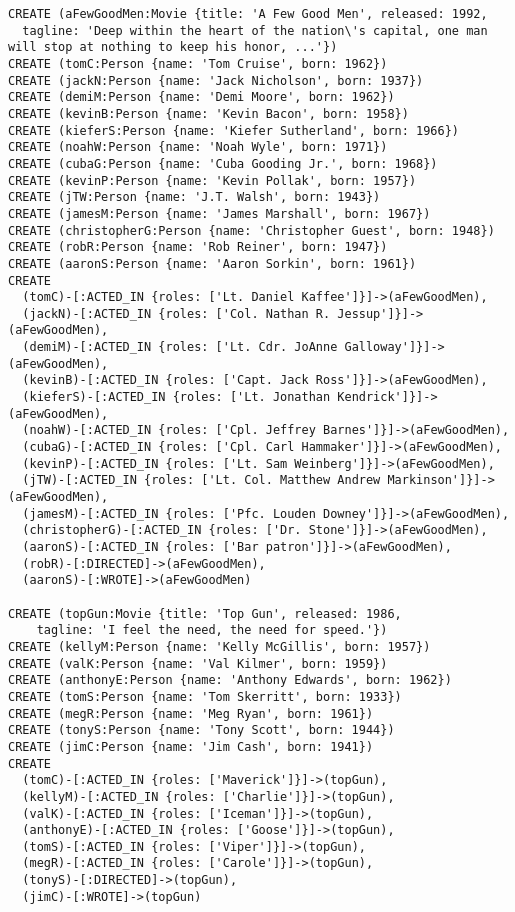 \begin{lstlisting}
CREATE (aFewGoodMen:Movie {title: 'A Few Good Men', released: 1992,
  tagline: 'Deep within the heart of the nation\'s capital, one man will stop at nothing to keep his honor, ...'})
CREATE (tomC:Person {name: 'Tom Cruise', born: 1962})
CREATE (jackN:Person {name: 'Jack Nicholson', born: 1937})
CREATE (demiM:Person {name: 'Demi Moore', born: 1962})
CREATE (kevinB:Person {name: 'Kevin Bacon', born: 1958})
CREATE (kieferS:Person {name: 'Kiefer Sutherland', born: 1966})
CREATE (noahW:Person {name: 'Noah Wyle', born: 1971})
CREATE (cubaG:Person {name: 'Cuba Gooding Jr.', born: 1968})
CREATE (kevinP:Person {name: 'Kevin Pollak', born: 1957})
CREATE (jTW:Person {name: 'J.T. Walsh', born: 1943})
CREATE (jamesM:Person {name: 'James Marshall', born: 1967})
CREATE (christopherG:Person {name: 'Christopher Guest', born: 1948})
CREATE (robR:Person {name: 'Rob Reiner', born: 1947})
CREATE (aaronS:Person {name: 'Aaron Sorkin', born: 1961})
CREATE
  (tomC)-[:ACTED_IN {roles: ['Lt. Daniel Kaffee']}]->(aFewGoodMen),
  (jackN)-[:ACTED_IN {roles: ['Col. Nathan R. Jessup']}]->(aFewGoodMen),
  (demiM)-[:ACTED_IN {roles: ['Lt. Cdr. JoAnne Galloway']}]->(aFewGoodMen),
  (kevinB)-[:ACTED_IN {roles: ['Capt. Jack Ross']}]->(aFewGoodMen),
  (kieferS)-[:ACTED_IN {roles: ['Lt. Jonathan Kendrick']}]->(aFewGoodMen),
  (noahW)-[:ACTED_IN {roles: ['Cpl. Jeffrey Barnes']}]->(aFewGoodMen),
  (cubaG)-[:ACTED_IN {roles: ['Cpl. Carl Hammaker']}]->(aFewGoodMen),
  (kevinP)-[:ACTED_IN {roles: ['Lt. Sam Weinberg']}]->(aFewGoodMen),
  (jTW)-[:ACTED_IN {roles: ['Lt. Col. Matthew Andrew Markinson']}]->(aFewGoodMen),
  (jamesM)-[:ACTED_IN {roles: ['Pfc. Louden Downey']}]->(aFewGoodMen),
  (christopherG)-[:ACTED_IN {roles: ['Dr. Stone']}]->(aFewGoodMen),
  (aaronS)-[:ACTED_IN {roles: ['Bar patron']}]->(aFewGoodMen),
  (robR)-[:DIRECTED]->(aFewGoodMen),
  (aaronS)-[:WROTE]->(aFewGoodMen)

CREATE (topGun:Movie {title: 'Top Gun', released: 1986,
    tagline: 'I feel the need, the need for speed.'})
CREATE (kellyM:Person {name: 'Kelly McGillis', born: 1957})
CREATE (valK:Person {name: 'Val Kilmer', born: 1959})
CREATE (anthonyE:Person {name: 'Anthony Edwards', born: 1962})
CREATE (tomS:Person {name: 'Tom Skerritt', born: 1933})
CREATE (megR:Person {name: 'Meg Ryan', born: 1961})
CREATE (tonyS:Person {name: 'Tony Scott', born: 1944})
CREATE (jimC:Person {name: 'Jim Cash', born: 1941})
CREATE
  (tomC)-[:ACTED_IN {roles: ['Maverick']}]->(topGun),
  (kellyM)-[:ACTED_IN {roles: ['Charlie']}]->(topGun),
  (valK)-[:ACTED_IN {roles: ['Iceman']}]->(topGun),
  (anthonyE)-[:ACTED_IN {roles: ['Goose']}]->(topGun),
  (tomS)-[:ACTED_IN {roles: ['Viper']}]->(topGun),
  (megR)-[:ACTED_IN {roles: ['Carole']}]->(topGun),
  (tonyS)-[:DIRECTED]->(topGun),
  (jimC)-[:WROTE]->(topGun)


\end{lstlisting}
